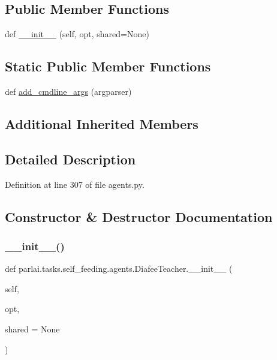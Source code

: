\subsection*{Public Member Functions}
\begin{DoxyCompactItemize}
\item 
def \hyperlink{classparlai_1_1tasks_1_1self__feeding_1_1agents_1_1DiafeeTeacher_ab22b116d01e06c69aecafdad8b16ecb8}{\+\_\+\+\_\+init\+\_\+\+\_\+} (self, opt, shared=None)
\end{DoxyCompactItemize}
\subsection*{Static Public Member Functions}
\begin{DoxyCompactItemize}
\item 
def \hyperlink{classparlai_1_1tasks_1_1self__feeding_1_1agents_1_1DiafeeTeacher_aab781156a05d1046b153df4920d4ce6b}{add\+\_\+cmdline\+\_\+args} (argparser)
\end{DoxyCompactItemize}
\subsection*{Additional Inherited Members}


\subsection{Detailed Description}


Definition at line 307 of file agents.\+py.



\subsection{Constructor \& Destructor Documentation}
\mbox{\label{classparlai_1_1tasks_1_1self__feeding_1_1agents_1_1DiafeeTeacher_ab22b116d01e06c69aecafdad8b16ecb8}} 
\subsubsection{\texorpdfstring{\+\_\+\+\_\+init\+\_\+\+\_\+()}{\_\_init\_\_()}}
{\footnotesize\ttfamily def parlai.\+tasks.\+self\+\_\+feeding.\+agents.\+Diafee\+Teacher.\+\_\+\+\_\+init\+\_\+\+\_\+ (\begin{DoxyParamCaption}\item[{}]{self,  }\item[{}]{opt,  }\item[{}]{shared = {\ttfamily None} }\end{DoxyParamCaption})}



